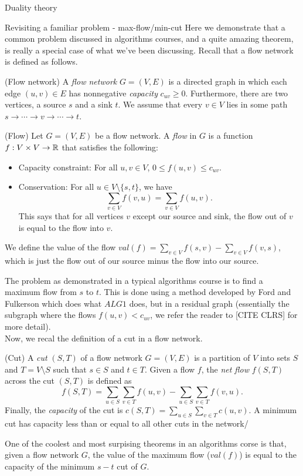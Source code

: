 \begin{section}{Duality theory}
\begin{subsection}{Revisiting a familiar problem - max-flow/min-cut}
	Here we demonstrate that a common problem discussed in algorithms courses, and a quite 
	amazing theorem, is really a special case of what we've been discussing. Recall that a 
	flow network is defined as follows.
	\begin{definition}{(Flow network)}
		A \emph{flow network} $G = (V,E)$ is a directed graph in which each edge $(u,v)\in E$ 
		has nonnegative \emph{capacity} $c_{uv} \geq 0$. Furthermore, there are two 
		vertices, a source $s$ and a sink $t$. We assume that every $v\in V$ lies in 
		some path $s\to \cdots \to v\to \cdots \to t$.
	\end{definition}
	\begin{definition}{(Flow)}
		Let $G = (V,E)$ be a flow network. A \emph{flow} in $G$ is a function $f: V\times V \to 
		\mathbb{R}$ that satisfies the following:
		\begin{itemize}
			\item Capacity constraint: For all $u,v\in V$, $0\leq f(u,v) \leq 
				c_{uv}$.
			\item Conservation: For all $u\in V\setminus \{s,t\}$, we have 
				\[
					\sum _{v\in V} f(v,u) = \sum_{v\in V} f(u,v).
				\]
				This says that for all vertices $v$ except our source and sink, the 
				flow out of $v$ is equal to the flow into $v$. 
		\end{itemize}
		We define the value of the flow $val(f) = \sum_{v\in V} f(s,v) - \sum_{v\in V} f(v,s)$, 
		which is just the flow out of our source minus the flow into our source.
	\end{definition}
	The problem as demonstrated in a typical algorithms course is to find a maximum flow from $s$ 
	to $t$. This is done using a method developed by Ford and Fulkerson which does what $ALG 1$ 
	does, but in a residual graph (essentially the subgraph where the flows $f(u,v) < c_{uv}$, we 
	refer the reader to [CITE CLRS] for more detail). \\
	Now, we recal the definition of a cut in a flow network.
	\begin{definition}{(Cut)}
		A \emph{cut} $(S,T)$ of a flow network $G=(V,E)$ is a partition of $V$ into sets $S$ 
		and $T = V\setminus S$ such that $s\in S$ and $t\in T$. Given a flow $f$, the 
		\emph{net flow} $f(S,T)$ across the cut $(S,T)$ is defined as 
		\[
			f(S,T) = \sum_{u\in S} \sum_{v\in T} f(u,v) - \sum_{u\in S} \sum_{v\in T} 
			f(v,u).
		\]
		Finally, the \emph{capacity} of the cut is $c(S,T) = 
		\sum_{u\in S} \sum_{v\in T} c(u,v)$. A minimum cut has capacity less than or equal to 
		all other cuts in the network/
	\end{definition}
	One of the coolest and most surpising theorems in an algorithms corse is that, given a flow 
	network $G$, the value of the maximum flow ($val(f)$) is equal to the capacity of the minimum 
	$s-t$ cut of $G$.


\end{subsection}
\end{section}
